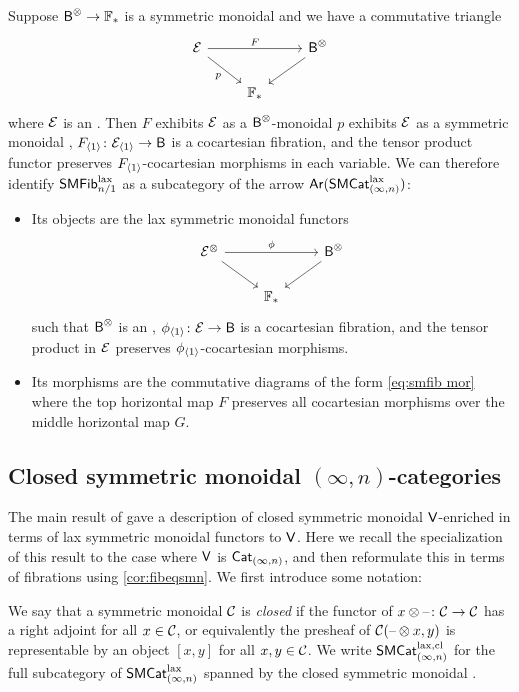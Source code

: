 \documentclass[a4paper,11pt]{article}
\begin{document}
\begin{observation}\label{obs:Bmon via symmon}
  Suppose $\oB^{\otimes} \to \xF_{*}$ is a symmetric monoidal
  \icat{} and we have a commutative triangle
  \[
    \begin{tikzcd}
     \nE \ar[rr, "F"] \ar[dr, "p"'] & & \oB^{\otimes} \ar[dl] \\
      & \xF_{*}
    \end{tikzcd}
  \]
  where $\mathcal{E}$ is an \incat{}.  Then $F$ exhibits $\mathcal{E}$ as a
  $\textup{\textsf{B}}^{\otimes}$-monoidal \incat{} \IFF{} $p$ exhibits $\mathcal{E}$ as a
  symmetric monoidal \incat{},
  $F_{\angled{1}} \colon \nE_{\angled{1}} \to \oB$ is a cocartesian
  fibration, and the tensor product functor preserves
  $F_{\langle 1 \rangle}$-cocartesian morphisms in each variable.
  We can therefore identify $\textup{\textsf{SMFib}}^{\text{\textup{lax}}}_{n/1}$ as a subcategory of the
  arrow \icat{}  $\textup{\textsf{Ar}}(\textup{\textsf{SMCat}}_{(\infty,n)}^{\text{\textup{lax}}})$:
  \begin{itemize}
  \item Its objects are the lax symmetric monoidal functors
    \[
      \begin{tikzcd}
       \nE^{\otimes} \ar[rr, "\phi"] \ar[dr] & & \oB^{\otimes} \ar[dl] \\
        & \xF_{*}
      \end{tikzcd}
    \]
    such that $\textup{\textsf{B}}^{\otimes}$ is an \icat{}, $\phi_{\angled{1}} \colon
    \nE \to \oB$ is a cocartesian fibration, and the tensor product in $\mathcal{E}$
    preserves $\phi_{\langle 1 \rangle}$-cocartesian morphisms.
  \item Its morphisms are the commutative diagrams of the form
    \cref{eq:smfib mor} where the top horizontal map $F$ preserves all
    cocartesian morphisms over the middle horizontal map $G$.
  \end{itemize}
\end{observation}


\subsection{Closed symmetric monoidal $(\infty,n)$-categories}\label{subsec:closed}

The main result of \cite{closed} gave a description of closed
symmetric monoidal $\textup{\textsf{V}}$-enriched \icats{} in terms of lax symmetric
monoidal functors to $\textup{\textsf{V}}$. Here we recall the specialization of this
result to the case where $\textup{\textsf{V}}$ is $\textup{\textsf{Cat}}_{(\infty,n)}$, and then reformulate this
in terms of fibrations using \cref{cor:fibeqsmn}. We first introduce
some notation:

\begin{defn}
  We say that a symmetric monoidal \incat{} $\mathcal{C}$ is \emph{closed} if
  the functor of \incats{} $x \otimes \blank \colon \eC \to \eC$ has a
  right adjoint for all $x \in \mathcal{C}$, or equivalently the presheaf of
  \inmcats{} $\mathcal{C}(\text{\textendash} \otimes x, y)$ is
  representable by an object $[x,y]$ for all $x,y \in \mathcal{C}$. We write
  $\textup{\textsf{SMCat}}_{(\infty,n)}^{\text{\textup{lax}},\text{\textup{cl}}}$ for the full subcategory of $\textup{\textsf{SMCat}}_{(\infty,n)}^{\text{\textup{lax}}}$ spanned by the
  closed symmetric monoidal \incats{}.
\end{defn}
\end{document}
